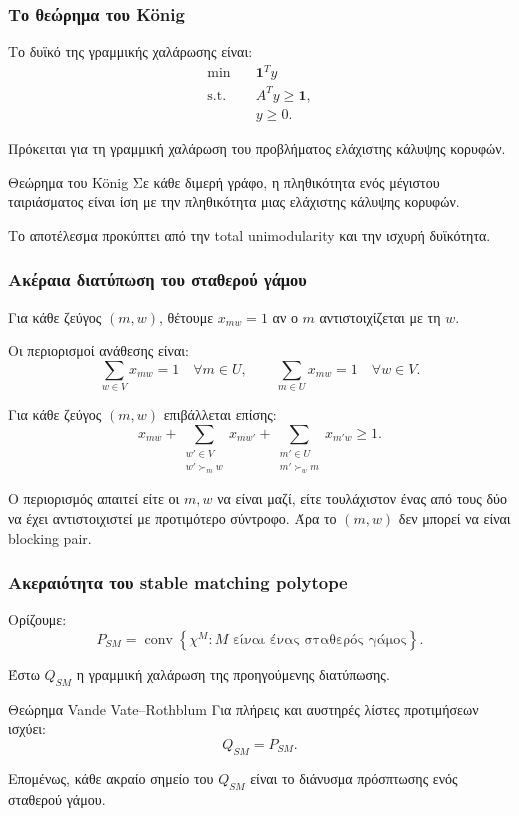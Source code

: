 \documentclass{beamer}
\newcommand{\en}{\selectlanguage{english}}
\newcommand{\gr}{\selectlanguage{greek}}
\begin{document}
	\begin{frame}
		\frametitle{Το θεώρημα του K\"onig}
		
		Το δυϊκό της γραμμικής χαλάρωσης είναι:
		\[
		\begin{aligned}
			\min \quad & \mathbf{1}^Ty\\
			\text{s.t.}\quad
			& A^Ty\geq \mathbf{1},\\
			& y\geq 0.
		\end{aligned}
		\]
		
		Πρόκειται για τη γραμμική χαλάρωση του προβλήματος ελάχιστης κάλυψης κορυφών.
		
		\begin{block}{Θεώρημα του K\"onig}
			Σε κάθε διμερή γράφο, η πληθικότητα ενός μέγιστου ταιριάσματος είναι ίση με την πληθικότητα μιας ελάχιστης κάλυψης κορυφών.
		\end{block}
		
		Το αποτέλεσμα προκύπτει από την \en total unimodularity \gr και την ισχυρή δυϊκότητα.
	\end{frame}
	
	\begin{frame}
		\frametitle{Ακέραια διατύπωση του σταθερού γάμου}
		
		Για κάθε ζεύγος $(m,w)$, θέτουμε $x_{mw}=1$ αν ο $m$ αντιστοιχίζεται με τη $w$.
		
		Οι περιορισμοί ανάθεσης είναι:
		\[
		\sum_{w\in V}x_{mw}=1
		\quad \forall m\in U,
		\qquad
		\sum_{m\in U}x_{mw}=1
		\quad \forall w\in V.
		\]
		
		Για κάθε ζεύγος $(m,w)$ επιβάλλεται επίσης:
		\small
		\[
		x_{mw}
		+
		\sum_{\substack{w'\in V\\w'\succ_m w}}x_{mw'}
		+
		\sum_{\substack{m'\in U\\m'\succ_w m}}x_{m'w}
		\geq 1.
		\]
		\normalsize
		
		Ο περιορισμός απαιτεί είτε οι $m,w$ να είναι μαζί, είτε τουλάχιστον ένας από τους δύο να έχει αντιστοιχιστεί με προτιμότερο σύντροφο. Άρα το $(m,w)$ δεν μπορεί να είναι blocking pair.
	\end{frame}
	
	\begin{frame}
		\frametitle{Ακεραιότητα του stable matching polytope}
		
		Ορίζουμε:
		\[
		P_{SM}
		=
		\operatorname{conv}
		\left\{
		\chi^M:
		M \text{ είναι ένας σταθερός γάμος}
		\right\}.
		\]
		
		Έστω $Q_{SM}$ η γραμμική χαλάρωση της προηγούμενης διατύπωσης.
		
		\begin{block}{Θεώρημα Vande Vate--Rothblum}
			Για πλήρεις και αυστηρές λίστες προτιμήσεων ισχύει:
			\[
			Q_{SM}=P_{SM}.
			\]
		\end{block}
		
		Επομένως, κάθε ακραίο σημείο του $Q_{SM}$ είναι το διάνυσμα πρόσπτωσης ενός σταθερού γάμου.
	\end{frame}
	
\end{document}

